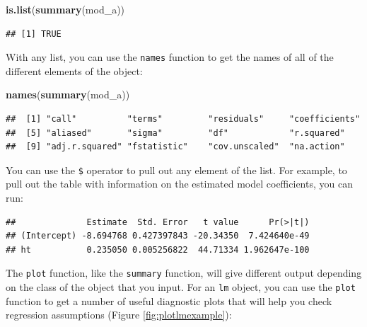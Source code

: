 \documentclass[]{book}
\makeatletter
\newenvironment{Shaded}{\begin{snugshade}}{\end{snugshade}}
\newcommand{\KeywordTok}[1]{\textcolor[rgb]{0.13,0.29,0.53}{\textbf{{#1}}}}
\newcommand{\NormalTok}[1]{{#1}}
\newenvironment{kframe}{%
\medskip{}
\setlength{\fboxsep}{.8em}
 \def\at@end@of@kframe{}%
 \ifinner\ifhmode%
  \def\at@end@of@kframe{\end{minipage}}%
  \begin{minipage}{\columnwidth}%
 \fi\fi%
 \def\FrameCommand##1{\hskip\@totalleftmargin \hskip-\fboxsep
 \colorbox{shadecolor}{##1}\hskip-\fboxsep
     \hskip-\linewidth \hskip-\@totalleftmargin \hskip\columnwidth}%
 \MakeFramed {\advance\hsize-\width
   \@totalleftmargin\z@ \linewidth\hsize
   \@setminipage}}%
 {\par\unskip\endMakeFramed%
 \at@end@of@kframe}
\renewenvironment{Shaded}{\begin{kframe}}{\end{kframe}}
\makeatother
\begin{document}
\begin{Shaded}
\begin{Highlighting}[]
\KeywordTok{is.list}\NormalTok{(}\KeywordTok{summary}\NormalTok{(mod_a))}
\end{Highlighting}
\end{Shaded}

\begin{verbatim}
## [1] TRUE
\end{verbatim}

With any list, you can use the \texttt{names} function to get the names
of all of the different elements of the object:

\begin{Shaded}
\begin{Highlighting}[]
\KeywordTok{names}\NormalTok{(}\KeywordTok{summary}\NormalTok{(mod_a))}
\end{Highlighting}
\end{Shaded}

\begin{verbatim}
##  [1] "call"          "terms"         "residuals"     "coefficients" 
##  [5] "aliased"       "sigma"         "df"            "r.squared"    
##  [9] "adj.r.squared" "fstatistic"    "cov.unscaled"  "na.action"
\end{verbatim}

You can use the \texttt{\$} operator to pull out any element of the
list. For example, to pull out the table with information on the
estimated model coefficients, you can run:

\begin{Shaded}
\end{Shaded}

\begin{verbatim}
##              Estimate  Std. Error   t value      Pr(>|t|)
## (Intercept) -8.694768 0.427397843 -20.34350  7.424640e-49
## ht           0.235050 0.005256822  44.71334 1.962647e-100
\end{verbatim}

The \texttt{plot} function, like the \texttt{summary} function, will
give different output depending on the class of the object that you
input. For an \texttt{lm} object, you can use the \texttt{plot} function
to get a number of useful diagnostic plots that will help you check
regression assumptions (Figure \ref{fig:plotlmexample}):
\end{document}
